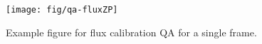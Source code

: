 \documentclass[12pt]{article}
\begin{document}
\begin{figure}[htb]
\begin{center}
\texttt{[image: fig/qa-fluxZP]}
\caption{Example figure for flux calibration QA
for a single frame.  
}
\label{fig:fluxcalib_frame}
\end{center}
\end{figure}




\def\apjl{ApJL} %
\def\aj{AJ} %
\def\apj{ApJ} %
\def\pasp{PASP} %
\def\spie{SPIE} %
\def\apjs{ApJS} %
\def\araa{ARAA} %
\def\aap{A\&A} %
\def\aaps{A\&A~Supl.} %
\def\nat{Nature} %
\def\nar{New Astron. Rev.} %
\def\mnras{MNRAS} %
\def\jcap{JCAP} %
\def\prd{{Phys.~Rev.~D}}        %
\def\physrep{{Phys.~Reports}} %



\end{document}
